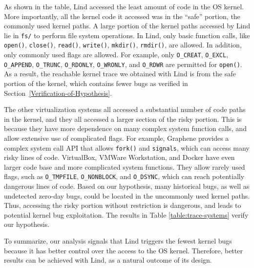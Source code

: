 {{{As shown in the table, Lind accessed the least amount of code in the OS
kernel. More importantly,
all the kernel code it accessed was in the ``safe'' portion, the
commonly used kernel paths.
A large portion of the kernel paths accessed by Lind lie in
\texttt{fs/} to perform file system operations.
In Lind, only basic function calls,
like \texttt{open()}, \texttt{close()}, \texttt{read()}, \texttt{write()}, \texttt{mkdir()},
\texttt{rmdir()}, are allowed. In addition, only commonly used flags are allowed. For example,
only \texttt{O\_CREAT}, \texttt{O\_EXCL}, \texttt{O\_APPEND}, \texttt{O\_TRUNC},
\texttt{O\_RDONLY}, \texttt{O\_WRONLY}, and \texttt{O\_RDWR} are permitted for \texttt{open()}.
As a result, the reachable kernel trace we obtained with Lind is from the safe
portion of the kernel, which contains fewer bugs
as verified in Section~{\ref{Verification-of-Hypothesis}}.

The other virtualization systems all accessed a substantial number of code
paths in the kernel,
and they all accessed a larger section of the risky portion.
This is because they have
more dependence on many complex system function calls, and
allow extensive use of complicated flags. For example,
Graphene provides a complex system call API that allows
\texttt{fork()} and \texttt{signals}, which can access many risky lines of code.
VirtualBox, VMWare Workstation, and Docker have even larger
code base and more complicated system functions. They allow
rarely used flags, such as \texttt{O\_TMPFILE}, \texttt{O\_NONBLOCK},
and \texttt{O\_DSYNC}, which can reach potentially dangerous lines
of code.
%
Based on our hypothesis, many historical bugs, as well as undetected
zero-day bugs, could be located in the uncommonly used kernel paths.
Thus, accessing the risky portion without restriction is dangerous, and
leads to potential kernel bug exploitation. The results in Table
\ref{table:trace-systems} verify our hypothesis.

To summarize, our analysis signals that Lind triggers the fewest kernel bugs because
it has better control over the access to the OS kernel.
Therefore, better results can be achieved with Lind, as a natural
outcome of its design. 

}}}
